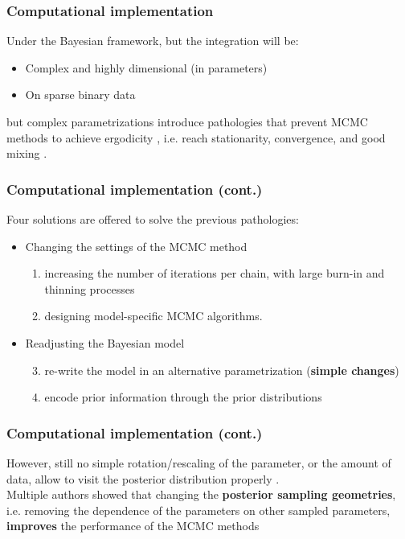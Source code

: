 \documentclass[arial,12pt,xcolor=dvipsnames]{beamer}
\begin{document}
\begin{frame}
	\frametitle{Computational implementation}
	Under the Bayesian framework, but the integration will be:
	\begin{itemize}
		\item Complex and highly dimensional (in parameters)
		\item On sparse binary data
	\end{itemize}
	\vspace{0.3cm} but complex parametrizations introduce pathologies that prevent MCMC methods to achieve ergodicity \cite{Gelfand_et_al_1995, Gelfand_et_al_1996, Papaspiliopoulos_et_al_2003, Papaspiliopoulos_et_al_2007, Betancourt_et_al_2013}, i.e. reach stationarity, convergence, and good mixing \cite{McElreath_2020}.
\end{frame}
%
\begin{frame}
	\frametitle{Computational implementation (cont.)}
	Four solutions are offered to solve the previous pathologies:
	\begin{itemize}
		\item Changing the settings of the MCMC method
		\begin{enumerate}
			\item increasing the number of iterations per chain, with large burn-in and thinning processes
			\item designing model-specific MCMC algorithms.
		\end{enumerate}
		\item Readjusting the Bayesian model
		\begin{enumerate}
			\setcounter{enumi}{2}
			\item re-write the model in an alternative parametrization (\textbf{simple changes})
			\item encode prior information through the prior distributions
		\end{enumerate}
	\end{itemize}
\end{frame}
%
\begin{frame}
	\frametitle{Computational implementation (cont.)}
	However, still no simple rotation/rescaling of the parameter, or the amount of data, allow to visit the posterior distribution properly \cite{Betancourt_et_al_2013}. \\
	\vspace{0.3cm} Multiple authors showed that changing the \textbf{posterior sampling geometries}, i.e. removing the dependence of the parameters on other sampled parameters, \textbf{improves} the performance of the MCMC methods \cite{Gelfand_et_al_1995, Gelfand_et_al_1996, Papaspiliopoulos_et_al_2003, Papaspiliopoulos_et_al_2007, Betancourt_et_al_2013}
\end{frame}
%
%
\end{document}
